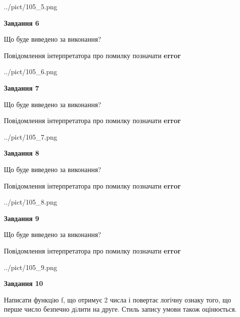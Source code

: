 \documentclass[12pt, ukrainian]{article}
\begin{document}
{\begin {large}
\begin{center}
	{../pict/105_5.png}
\end{center}
\newpage

{\begin {center}\textbf{Завдання 6}\end {center}}\par
Що буде виведено за виконання? \par
Повідомлення інтерпретатора про помилку позначати \textbf{error}

\begin{center}
	{../pict/105_6.png}
\end{center}
\newpage

{\begin {center}\textbf{Завдання 7}\end {center}}\par
Що буде виведено за виконання? \par
Повідомлення інтерпретатора про помилку позначати \textbf{error}

\begin{center}
	{../pict/105_7.png}
\end{center}
\newpage

{\begin {center}\textbf{Завдання 8}\end {center}}\par
Що буде виведено за виконання? \par
Повідомлення інтерпретатора про помилку позначати \textbf{error}

\begin{center}
	{../pict/105_8.png}
\end{center}
\newpage

{\begin {center}\textbf{Завдання 9}\end {center}}\par
Що буде виведено за виконання? \par
Повідомлення інтерпретатора про помилку позначати \textbf{error}

\begin{center}
	{../pict/105_9.png}
\end{center}
\newpage

{\begin {center}\textbf{Завдання 10}\end {center}}\par

Написати функцiю f, що отримує 2 числа і повертає логічну ознаку того, що перше число безпечно дiлити на друге. Стиль запису умови також оцінюється.\par
\newpage

\end {large}}
\end{document}
